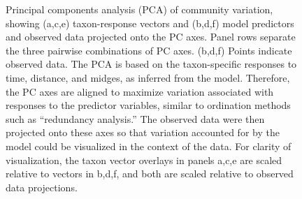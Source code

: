 \documentclass[12pt]{article}
\begin{document}
\begin{figure}
\begin{minipage}[c]{3.5in}
\end{minipage}\hfill
\begin{minipage}[c]{3in}
\caption{\label{fig:pca}
Principal components analysis (PCA) of community variation, showing
(a,c,e) taxon-response vectors and (b,d,f) model predictors and observed data projected onto the PC axes.
Panel rows separate the three pairwise combinations of PC axes.
(b,d,f) Points indicate observed data.
The PCA is based on the taxon-specific responses to time, distance, and midges,
as inferred from the model.
Therefore, the PC axes are aligned to maximize variation associated with responses
to the predictor variables, similar to ordination methods such as ``redundancy analysis.''
The observed data were then projected onto these axes so that variation accounted for
by the model could be visualized in the context of the data.
For clarity of visualization, the taxon vector overlays in panels a,c,e are scaled relative to vectors in b,d,f, and both are scaled
relative to observed data projections.
}
\end{minipage}
\end{figure}


\clearpage



\end{document}
